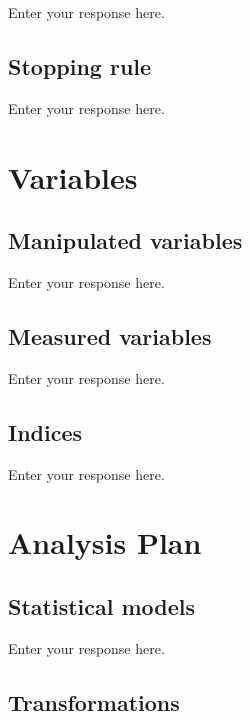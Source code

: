 \documentclass[]{article}
\begin{document}
Enter your response here.

\hypertarget{stopping-rule}{%
\subsection{Stopping rule}\label{stopping-rule}}

Enter your response here.

\hypertarget{variables}{%
\section{Variables}\label{variables}}

\hypertarget{manipulated-variables}{%
\subsection{Manipulated variables}\label{manipulated-variables}}

Enter your response here.

\hypertarget{measured-variables}{%
\subsection{Measured variables}\label{measured-variables}}

Enter your response here.

\hypertarget{indices}{%
\subsection{Indices}\label{indices}}

Enter your response here.

\hypertarget{analysis-plan}{%
\section{Analysis Plan}\label{analysis-plan}}

\hypertarget{statistical-models}{%
\subsection{Statistical models}\label{statistical-models}}

Enter your response here.

\hypertarget{transformations}{%
\subsection{Transformations}\label{transformations}}
\end{document}
